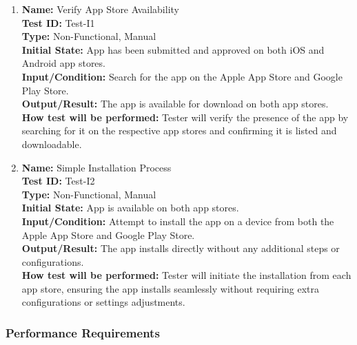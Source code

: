 \documentclass[12pt, titlepage]{article}
\begin{document}
\begin{enumerate}
    \item \textbf{Name:} Verify App Store Availability \label{itm:Test-I1} \\
    \textbf{Test ID:} Test-I1 \\
    \textbf{Type:} Non-Functional, Manual \\
    \textbf{Initial State:} App has been submitted and approved on both iOS and Android app stores. \\
    \textbf{Input/Condition:} Search for the app on the Apple App Store and Google Play Store. \\
    \textbf{Output/Result:} The app is available for download on both app stores. \\
    \textbf{How test will be performed:} Tester will verify the presence of the app by searching for it on the respective app stores and confirming it is listed and downloadable.

    \item \textbf{Name:} Simple Installation Process \label{itm:Test-I2} \\
    \textbf{Test ID:} Test-I2 \\
    \textbf{Type:} Non-Functional, Manual \\
    \textbf{Initial State:} App is available on both app stores. \\
    \textbf{Input/Condition:} Attempt to install the app on a device from both the Apple App Store and Google Play Store. \\
    \textbf{Output/Result:} The app installs directly without any additional steps or configurations. \\
    \textbf{How test will be performed:} Tester will initiate the installation from each app store, ensuring the app installs seamlessly without requiring extra configurations or settings adjustments.
\end{enumerate}

\subsubsection{Performance Requirements}
\end{document}
